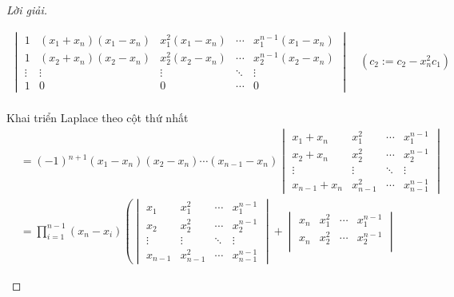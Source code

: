 \documentclass[class=linearalgebra,crop=false]{standalone}
\begin{document}
\begin{proof}[Lời giải]
\begin{enumerate}[label = (\alph*)]
\begin{align*}
\begin{vmatrix}
                      1      & (x_{1} + x_{n})(x_{1} - x_{n}) & x_{1}^{2}(x_{1} - x_{n}) & \cdots & x_{1}^{n-1}(x_{1} - x_{n}) \\
                      1      & (x_{2} + x_{n})(x_{2} - x_{n}) & x_{2}^{2}(x_{2} - x_{n}) & \cdots & x_{2}^{n-1}(x_{2} - x_{n}) \\
                      \vdots & \vdots                         & \vdots                   & \ddots & \vdots                     \\
                      1      & 0                              & 0                        & \cdots & 0
                  \end{vmatrix}\quad(c_{2}:=c_{2} - x_{n}^{2}c_{1}) \\
              \end{align*}
              \par Khai triển Laplace theo cột thứ nhất
              \begin{align*}
                   & = (-1){}^{n+1}(x_{1} - x_{n})(x_{2} - x_{n})\cdots (x_{n-1} - x_{n})
                  \begin{vmatrix}
                      x_{1} + x_{n}   & x_{1}^{2}   & \cdots & x_{1}^{n-1}   \\
                      x_{2} + x_{n}   & x_{2}^{2}   & \cdots & x_{2}^{n-1}   \\
                      \vdots          & \vdots      & \ddots & \vdots        \\
                      x_{n-1} + x_{n} & x_{n-1}^{2} & \cdots & x_{n-1}^{n-1}
                  \end{vmatrix}                  \\
                   & = \prod^{n-1}_{i=1}(x_{n} - x_{i})\left(
                  \begin{vmatrix}
                          x_{1}   & x_{1}^{2}   & \cdots & x_{1}^{n-1}   \\
                          x_{2}   & x_{2}^{2}   & \cdots & x_{2}^{n-1}   \\
                          \vdots  & \vdots      & \ddots & \vdots        \\
                          x_{n-1} & x_{n-1}^{2} & \cdots & x_{n-1}^{n-1}
                      \end{vmatrix}
                  +
                  \begin{vmatrix}
                          x_{n}  & x_{1}^{2}   & \cdots & x_{1}^{n-1}   \\
                          x_{n}  & x_{2}^{2}   & \cdots & x_{2}^{n-1}   \\

\end{vmatrix}
\end{align*}
\end{enumerate}
\end{proof}
\end{document}
